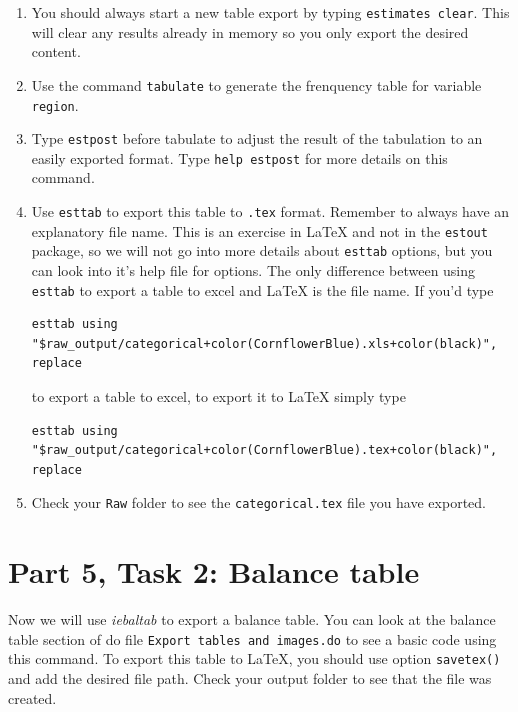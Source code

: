 \documentclass[]{article}
\begin{document}
\begin{enumerate}
	\item You should always start a new table export by typing \texttt{estimates clear}. This will clear any results already in memory so you only export the desired content.
	\item Use the command \texttt{tabulate} to generate the frenquency table for variable \texttt{region}.
	\item Type \texttt{estpost} before tabulate to adjust the result of the tabulation to an easily exported format. Type \texttt{help estpost} for more details on this command.
	\item Use \texttt{esttab} to export this table to \texttt{.tex} format. Remember to always have an explanatory file name. This is an exercise in {\LaTeX} and not in the \texttt{estout} package, so we will not go into more details about \texttt{esttab} options, but you can look into it's help file for options. The only difference between using \texttt{esttab} to export a table to excel and {\LaTeX} is the file name. If you'd type 
	
	\begin{Verbatim}[commandchars=+\(\)]
	esttab using "$raw_output/categorical+color(CornflowerBlue).xls+color(black)", replace
	\end{Verbatim}
	
	to export a table to excel, to export it to {\LaTeX} simply type 
	
	\begin{Verbatim}[commandchars=+\(\)]
	esttab using "$raw_output/categorical+color(CornflowerBlue).tex+color(black)", replace
	\end{Verbatim}
	
	\item Check your \texttt{Raw} folder to see the \texttt{categorical.tex} file you have exported.
\end{enumerate}

\section*{Part 5, Task 2: Balance table}

Now we will use \emph{iebaltab} to export a balance table. You can look at the balance table section of do file \texttt{Export tables and images.do} to see a basic code using this command. To export this table to {\LaTeX}, you should use option \texttt{savetex()} and add the desired file path. Check your output folder to see that the file was created.
\end{document}
